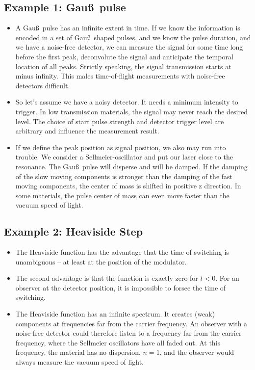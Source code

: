 \documentclass[12pt,a4paper,twoside,openright,BCOR10mm,headsepline,titlepage,abstracton,chapterprefix,final]{scrreprt}
\begin{document}
\subsection{Example 1: Gau\ss\, pulse}
\begin{itemize}
 \item A Gau\ss\, pulse has an infinite extent in time.
       If we know the information is encoded in a set of Gau\ss\, shaped pulses,
       and we know the pulse duration,
       and we have a noise-free detector, 
       we can measure the signal for some time long before the first peak,
       deconvolute the signal and anticipate the temporal location of all peaks.
       Strictly speaking, the signal transmission starts at minus infinity.
       This males time-of-flight measurements with noise-free detectors difficult.
 \item So let's assume we have a noisy detector.
       It needs a minimum intensity to trigger.
       In low transmission materials, the signal may never reach the desired level.
       The choice of start pulse strength and detector trigger level are arbitrary and influence the measurement result.
 \item If we define the peak position as signal position, we also may run into trouble.
       We consider a Sellmeier-oscillator and put our laser close to the resonance.
       The Gau\ss\, pulse will disperse and will be damped.
       If the damping of the slow moving components is stronger than the damping of the fast moving components,
       the center of mass is shifted in positive z direction.
       In some materials, the pulse center of mass can even move faster than the vacuum speed of light.
\end{itemize}

\subsection{Example 2: Heaviside Step}
\begin{itemize}
 \item The Heaviside function has the advantage that the time of switching is unambiguous -- at least at the position of the modulator.
 \item The second advantage is that the function is exactly zero for $t<0$.
       For an observer at the detector position, it is impossible to forsee the time of switching.
 \item The Heaviside function has an infinite spectrum.
       It creates (weak) components at frequencies far from the carrier frequency.
       An observer with a noise-free detector could therefore listen to a frequency far from the carrier frequency,
       where the Sellmeier oscillators have all faded out.
       At this frequency, the material has no dispersion, $n=1$, 
       and the observer would always measure the vacuum speed of light.
\end{itemize}
\end{document}
